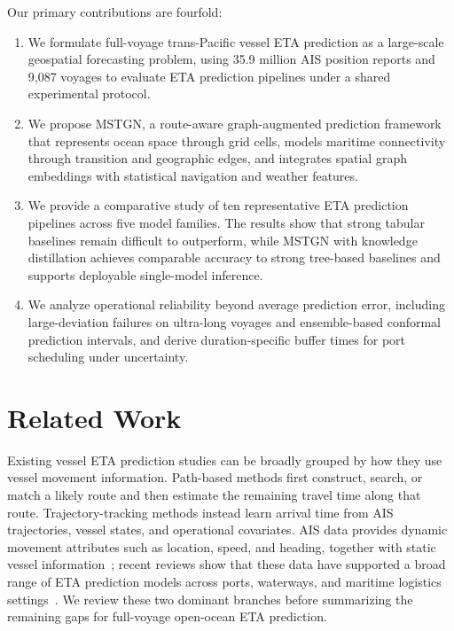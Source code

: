 \documentclass[sigconf,anonymous]{acmart}%
\begin{document}
Our primary contributions are fourfold:
\begin{enumerate}
    \item We formulate full-voyage trans-Pacific vessel ETA prediction as a large-scale geospatial forecasting problem, using 35.9 million AIS position reports and 9,087 voyages to evaluate ETA prediction pipelines under a shared experimental protocol.

    \item We propose MSTGN, a route-aware graph-augmented prediction framework that represents ocean space through grid cells, models maritime connectivity through transition and geographic edges, and integrates spatial graph embeddings with statistical navigation and weather features.

    \item We provide a comparative study of ten representative ETA prediction pipelines across five model families. The results show that strong tabular baselines remain difficult to outperform, while MSTGN with knowledge distillation achieves comparable accuracy to strong tree-based baselines and supports deployable single-model inference.

    \item We analyze operational reliability beyond average prediction error, including large-deviation failures on ultra-long voyages and ensemble-based conformal prediction intervals, and derive duration-specific buffer times for port scheduling under uncertainty.
\end{enumerate}

\section{Related Work}

Existing vessel ETA prediction studies can be broadly grouped by how they use vessel movement information.
Path-based methods first construct, search, or match a likely route and then estimate the remaining travel time along that route.
Trajectory-tracking methods instead learn arrival time from AIS trajectories, vessel states, and operational covariates.
AIS data provides dynamic movement attributes such as location, speed, and heading, together with static vessel information~\cite{yangHarnessingPowerMachine2024}; recent reviews show that these data have supported a broad range of ETA prediction models across ports, waterways, and maritime logistics settings~\cite{jiangPredictionVesselArrival2025,nomanReviewVesselTime2025}.
We review these two dominant branches before summarizing the remaining gaps for full-voyage open-ocean ETA prediction.
\end{document}
